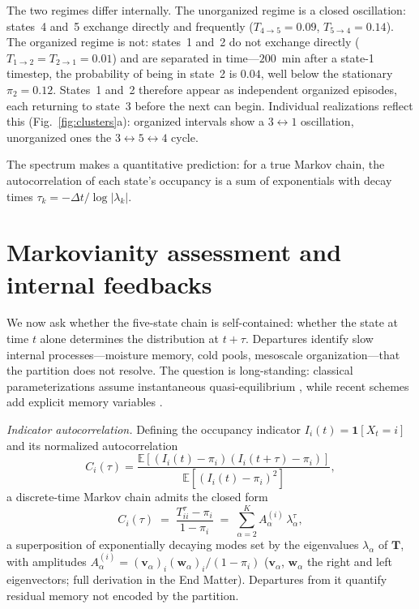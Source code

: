 \documentclass[
    aps,
    prl,
    reprint,
    superscriptaddress,
    amsmath,amssymb,
    floatfix,
    nofootinbib
]{revtex4-2}
\begin{document}
The two regimes differ internally. The unorganized regime is a closed oscillation: states~4 and~5 exchange directly and frequently ($T_{4\to 5}=0.09$, $T_{5\to 4}=0.14$). The organized regime is not: states~1 and~2 do not exchange directly ($T_{1\to 2}=T_{2\to 1}=0.01$) and are separated in time---$200$~min after a state-1 timestep, the probability of being in state~2 is $0.04$, well below the stationary $\pi_2=0.12$. States~1 and~2 therefore appear as independent organized episodes, each returning to state~3 before the next can begin. Individual realizations reflect this (Fig.~\ref{fig:clusters}a): organized intervals show a $3\!\leftrightarrow\!1$ oscillation, unorganized ones the $3\!\leftrightarrow\!5\!\leftrightarrow\!4$ cycle.

The spectrum makes a quantitative prediction: for a true Markov chain, the autocorrelation of each state's occupancy is a sum of exponentials with decay times $\tau_k = -\Delta t / \log|\lambda_k|$.

\section{Markovianity assessment and internal feedbacks}
\label{sec:markov}

We now ask whether the five-state chain is self-contained: whether the state at time $t$ alone determines the distribution at $t+\tau$. Departures identify slow internal processes---moisture memory, cold pools, mesoscale organization---that the partition does not resolve. The question is long-standing: classical parameterizations assume instantaneous quasi-equilibrium \cite{zhang2003convective, bechtold2014representing}, while recent schemes add explicit memory variables \cite{piriou2007approach, gerard2009cloud, mapes2011parameterizing, hwong2023assessing}.

\emph{Indicator autocorrelation.} Defining the occupancy indicator $I_i(t) = \mathbf{1}[X_t = i]$ and its normalized autocorrelation
\begin{equation}
C_i(\tau) =
\frac{\mathbb{E}\!\left[(I_i(t)-\pi_i)(I_i(t+\tau)-\pi_i)\right]}
     {\mathbb{E}\!\left[(I_i(t)-\pi_i)^2\right]},
\end{equation}
a discrete-time Markov chain admits the closed form \cite{souza2024representing}
\begin{equation}
C_i(\tau) \;=\; \frac{T^\tau_{ii} - \pi_i}{1-\pi_i}
\;=\; \sum_{\alpha=2}^K A_\alpha^{(i)}\, \lambda_\alpha^\tau,
\label{eq:autocor}
\end{equation}
a superposition of exponentially decaying modes set by the eigenvalues $\lambda_\alpha$ of $\mathbf{T}$, with amplitudes $A_\alpha^{(i)} = (\mathbf{v}_\alpha)_i (\mathbf{w}_\alpha)_i / (1-\pi_i)$ ($\mathbf{v}_\alpha$, $\mathbf{w}_\alpha$ the right and left eigenvectors; full derivation in the End Matter). Departures from it quantify residual memory not encoded by the partition.
\end{document}
